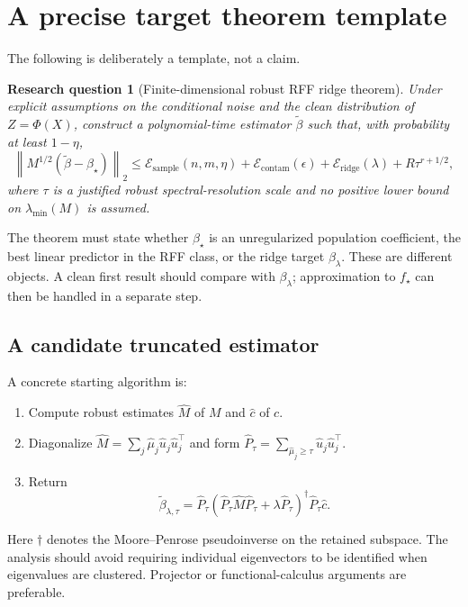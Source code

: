 \documentclass[11pt]{article}
\newtheorem{question}[definition]{Research question}
\newcommand{\cE}{\mathcal{E}}
\newcommand{\norm}[1]{\left\lVert #1\right\rVert}
\begin{document}
\section{A precise target theorem template}

The following is deliberately a template, not a claim.

\begin{question}[Finite-dimensional robust RFF ridge theorem]\label{q:main}
Under explicit assumptions on the conditional noise and the clean distribution
of $Z=\Phi(X)$, construct a polynomial-time estimator $\widetilde\beta$ such
that, with probability at least $1-\eta$,
\begin{equation}\label{eq:target-template}
 \norm{M^{1/2}(\widetilde\beta-\beta_\star)}_2
 \leq
 \cE_{\mathrm{sample}}(n,m,\eta)
 +\cE_{\mathrm{contam}}(\epsilon)
 +\cE_{\mathrm{ridge}}(\lambda)
 +R\tau^{r+1/2},
\end{equation}
where $\tau$ is a justified robust spectral-resolution scale and no positive
lower bound on $\lambda_{\min}(M)$ is assumed.
\end{question}

The theorem must state whether $\beta_\star$ is an unregularized population
coefficient, the best linear predictor in the RFF class, or the ridge target
$\beta_\lambda$.  These are different objects.  A clean first result should
compare with $\beta_\lambda$; approximation to $f_\star$ can then be handled in
a separate step.

\subsection{A candidate truncated estimator}

A concrete starting algorithm is:
\begin{enumerate}
 \item Compute robust estimates $\widehat M$ of $M$ and $\widehat c$ of $c$.
 \item Diagonalize $\widehat M=\sum_j\widehat\mu_j
       \widehat u_j\widehat u_j^\top$ and form
       $\widehat P_\tau=\sum_{\widehat\mu_j\geq\tau}
       \widehat u_j\widehat u_j^\top$.
 \item Return
 \begin{equation}\label{eq:truncated-estimator}
  \widetilde\beta_{\lambda,\tau}
  =\widehat P_\tau
  (\widehat P_\tau\widehat M\widehat P_\tau+\lambda\widehat P_\tau)^{\dagger}
  \widehat P_\tau\widehat c.
 \end{equation}
\end{enumerate}
Here $\dagger$ denotes the Moore--Penrose pseudoinverse on the retained
subspace.  The analysis should avoid requiring individual eigenvectors to be
identified when eigenvalues are clustered.  Projector or functional-calculus
arguments are preferable.
\end{document}
